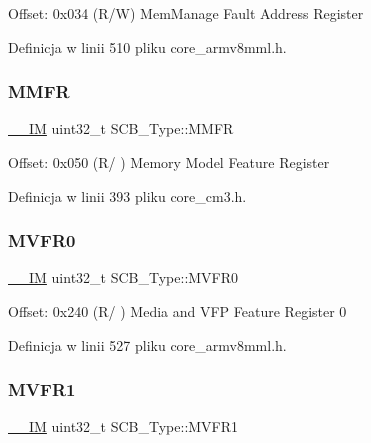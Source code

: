 Offset\+: 0x034 (R/W) Mem\+Manage Fault Address Register 

Definicja w linii 510 pliku core\+\_\+armv8mml.\+h.

\mbox{\label{struct_s_c_b___type_a4f353f207bb27a1cea7861aa9eb00dbb}} 
\subsubsection{\texorpdfstring{M\+M\+FR}{MMFR}}
{\footnotesize\ttfamily \hyperlink{core__sc300_8h_a4cc1649793116d7c2d8afce7a4ffce43}{\+\_\+\+\_\+\+IM} uint32\+\_\+t S\+C\+B\+\_\+\+Type\+::\+M\+M\+FR}

Offset\+: 0x050 (R/ ) Memory Model Feature Register 

Definicja w linii 393 pliku core\+\_\+cm3.\+h.

\mbox{\label{struct_s_c_b___type_a7a1ba0f875c0e97c1673882b1106e66b}} 
\subsubsection{\texorpdfstring{M\+V\+F\+R0}{MVFR0}}
{\footnotesize\ttfamily \hyperlink{core__sc300_8h_a4cc1649793116d7c2d8afce7a4ffce43}{\+\_\+\+\_\+\+IM} uint32\+\_\+t S\+C\+B\+\_\+\+Type\+::\+M\+V\+F\+R0}

Offset\+: 0x240 (R/ ) Media and V\+FP Feature Register 0 

Definicja w linii 527 pliku core\+\_\+armv8mml.\+h.

\mbox{\label{struct_s_c_b___type_a75d6299150fdcbbcb765e22ff27c432e}} 
\subsubsection{\texorpdfstring{M\+V\+F\+R1}{MVFR1}}
{\footnotesize\ttfamily \hyperlink{core__sc300_8h_a4cc1649793116d7c2d8afce7a4ffce43}{\+\_\+\+\_\+\+IM} uint32\+\_\+t S\+C\+B\+\_\+\+Type\+::\+M\+V\+F\+R1}

